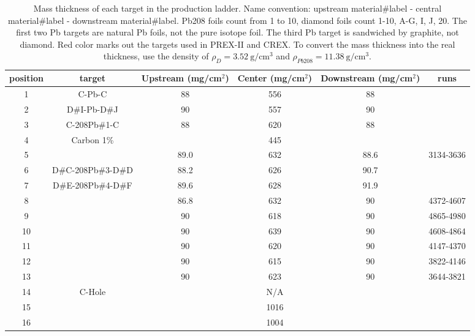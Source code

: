 \begin{table}[!h]
    \centering
    \begin{tabular}{c | c | c c c c}
	\hline
	position    & target& \makecell{Upstream \\ (mg/cm${}^2$)}    & \makecell{Center \\ (mg/cm${}^2$)}     & \makecell{Downstream \\ (mg/cm${}^2$)}   & runs  \\
	\hline
	1   & C-Pb-C	    & 88    & 556   & 88    & \\
	2   & D\#I-Pb-D\#J      & 90    & 557   & 90    & \\
	\hline
	3   & C-208Pb\#1-C    & 88    & 620   & 88    & \\
	4   & Carbon 1\%    &       & 445   &	    & \\
	\hline
	5   & \color{red}{D\#A-208Pb\#2-D\#B}  & 89.0  & 632   & 88.6  & 3134-3636 \\
	6   & D\#C-208Pb\#3-D\#D  & 88.2  & 626   & 90.7  & \\
	7   & D\#E-208Pb\#4-D\#F  & 89.6  & 628   & 91.9  & \\
	8   & \color{red}{D\#G-208Pb\#5-D\#20} & 86.8  & 632   & 90    & 4372-4607 \\
	9   & \color{red}{D\#1-208Pb\#6-D\#2}  & 90    & 618   & 90    & 4865-4980 \\
	10  & \color{red}{D\#3-208Pb\#7-D\#4}  & 90    & 639   & 90    & 4608-4864 \\
	11  & \color{red}{D\#5-208Pb\#8-D\#6}  & 90    & 620   & 90    & 4147-4370 \\
	12  & \color{red}{D\#7-208Pb\#9-D\#8}  & 90    & 615   & 90    & 3822-4146 \\
	13  & \color{red}{D\#9-208Pb\#10-D\#10}& 90    & 623   & 90    & 3644-3821 \\
	\hline
	14  & C-Hole	    &       & N/A   &       & \\
	15  & \color{red}{\Ca}	    &       & 1016  &       & \\
	16  & \ca	    &       & 1004  &       & \\
	\hline
    \end{tabular}
    \caption[Target mass thickness]
    {Mass thickness of each target in the production ladder. 
    Name convention: upstream material\#label - central material\#label - downstream material\#label. 
    Pb208 foils count from 1 to 10, diamond foils count 1-10, A-G, I, J, 20. 
    The first two Pb targets are natural Pb foils, not the pure \Pb isotope foil. 
    The third Pb target is sandwiched by graphite, not diamond. Red color marks
    out the targets used in PREX-II and CREX. To convert the mass thickness into 
    the real thickness, use the density of $\rho_D = 3.52\ \mathrm{g}/\mathrm{cm}^3$ 
    and $\rho_{Pb208} = 11.38 \ \mathrm{g}/\mathrm{cm}^3$.}
    \label{tab:target_thickness}
\end{table}

